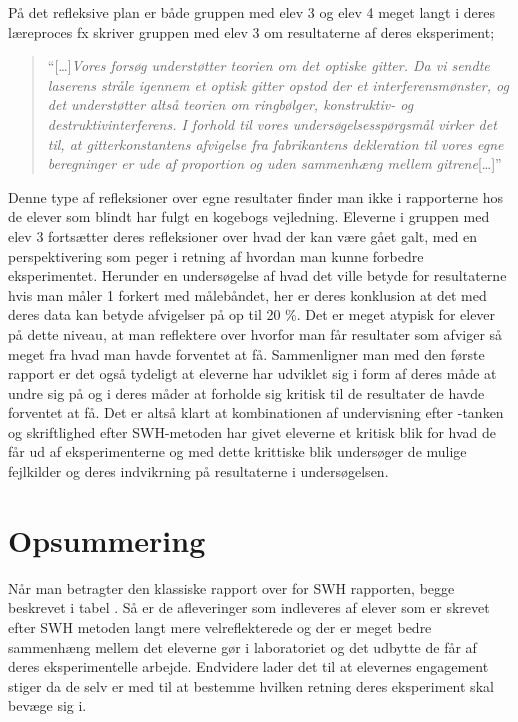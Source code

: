 På det refleksive plan er både gruppen med elev 3 og elev 4 meget langt i deres læreproces fx skriver gruppen med elev 3 om resultaterne af deres eksperiment;
\begin{quote}
``[\ldots]\emph{Vores forsøg understøtter teorien om  det optiske gitter. Da vi sendte laserens stråle igennem et optisk gitter opstod der et interferensmønster, og det understøtter altså teorien om ringbølger, konstruktiv- og destruktivinterferens. I forhold til vores undersøgelsesspørgsmål virker det til, at gitterkonstantens afvigelse fra fabrikantens dekleration til vores egne beregninger er ude af proportion og uden sammenhæng mellem gitrene}[\ldots]''
\end{quote}
Denne type af refleksioner over egne resultater finder man ikke i rapporterne hos de elever som blindt har fulgt en kogebogs vejledning. Eleverne i gruppen med elev 3 fortsætter deres refleksioner over hvad der kan være gået galt, med en perspektivering som peger i retning af hvordan man kunne forbedre eksperimentet. Herunder en undersøgelse af hvad det ville betyde for resultaterne hvis man måler 1 \centi\meter{} forkert med målebåndet, her er deres konklusion at det med deres data kan betyde afvigelser på op til 20 \%. Det er meget atypisk for elever på dette niveau, at man reflektere over hvorfor man får resultater som afviger så meget fra hvad man havde forventet at få. Sammenligner man med den første rapport er det også tydeligt at eleverne har udviklet sig i form af deres måde at undre sig på og i deres måder at forholde sig kritisk til de resultater de havde forventet at få. Det er altså klart at kombinationen af undervisning efter \ib-tanken og skriftlighed efter SWH-metoden har givet eleverne et kritisk blik for hvad de får ud af eksperimenterne og med dette krittiske blik undersøger de mulige fejlkilder og deres indvikrning på resultaterne i undersøgelsen. 

\section{Opsummering}
Når man betragter den klassiske rapport over for SWH rapporten, begge beskrevet i tabel . Så er de afleveringer som indleveres af elever som er skrevet efter SWH metoden langt mere velreflekterede og der er meget bedre sammenhæng mellem det eleverne gør i laboratoriet og det udbytte de får af deres eksperimentelle arbejde. Endvidere lader det til at elevernes engagement stiger da de selv er med til at bestemme hvilken retning deres eksperiment skal bevæge sig i.  

